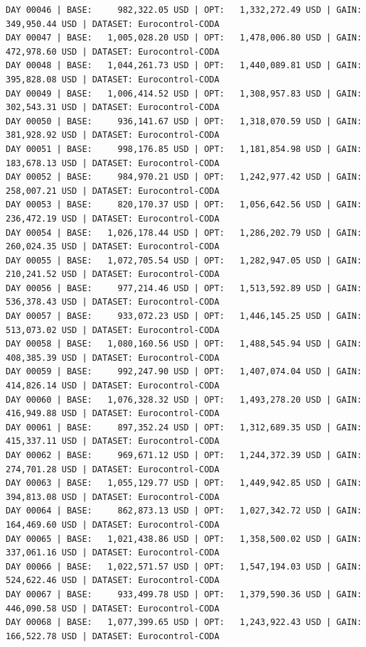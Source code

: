 \documentclass[11pt,a4paper]{article}
\begin{document}
\begin{verbatim}
DAY 00046 | BASE:     982,322.05 USD | OPT:   1,332,272.49 USD | GAIN: 349,950.44 USD | DATASET: Eurocontrol-CODA
DAY 00047 | BASE:   1,005,028.20 USD | OPT:   1,478,006.80 USD | GAIN: 472,978.60 USD | DATASET: Eurocontrol-CODA
DAY 00048 | BASE:   1,044,261.73 USD | OPT:   1,440,089.81 USD | GAIN: 395,828.08 USD | DATASET: Eurocontrol-CODA
DAY 00049 | BASE:   1,006,414.52 USD | OPT:   1,308,957.83 USD | GAIN: 302,543.31 USD | DATASET: Eurocontrol-CODA
DAY 00050 | BASE:     936,141.67 USD | OPT:   1,318,070.59 USD | GAIN: 381,928.92 USD | DATASET: Eurocontrol-CODA
DAY 00051 | BASE:     998,176.85 USD | OPT:   1,181,854.98 USD | GAIN: 183,678.13 USD | DATASET: Eurocontrol-CODA
DAY 00052 | BASE:     984,970.21 USD | OPT:   1,242,977.42 USD | GAIN: 258,007.21 USD | DATASET: Eurocontrol-CODA
DAY 00053 | BASE:     820,170.37 USD | OPT:   1,056,642.56 USD | GAIN: 236,472.19 USD | DATASET: Eurocontrol-CODA
DAY 00054 | BASE:   1,026,178.44 USD | OPT:   1,286,202.79 USD | GAIN: 260,024.35 USD | DATASET: Eurocontrol-CODA
DAY 00055 | BASE:   1,072,705.54 USD | OPT:   1,282,947.05 USD | GAIN: 210,241.52 USD | DATASET: Eurocontrol-CODA
DAY 00056 | BASE:     977,214.46 USD | OPT:   1,513,592.89 USD | GAIN: 536,378.43 USD | DATASET: Eurocontrol-CODA
DAY 00057 | BASE:     933,072.23 USD | OPT:   1,446,145.25 USD | GAIN: 513,073.02 USD | DATASET: Eurocontrol-CODA
DAY 00058 | BASE:   1,080,160.56 USD | OPT:   1,488,545.94 USD | GAIN: 408,385.39 USD | DATASET: Eurocontrol-CODA
DAY 00059 | BASE:     992,247.90 USD | OPT:   1,407,074.04 USD | GAIN: 414,826.14 USD | DATASET: Eurocontrol-CODA
DAY 00060 | BASE:   1,076,328.32 USD | OPT:   1,493,278.20 USD | GAIN: 416,949.88 USD | DATASET: Eurocontrol-CODA
DAY 00061 | BASE:     897,352.24 USD | OPT:   1,312,689.35 USD | GAIN: 415,337.11 USD | DATASET: Eurocontrol-CODA
DAY 00062 | BASE:     969,671.12 USD | OPT:   1,244,372.39 USD | GAIN: 274,701.28 USD | DATASET: Eurocontrol-CODA
DAY 00063 | BASE:   1,055,129.77 USD | OPT:   1,449,942.85 USD | GAIN: 394,813.08 USD | DATASET: Eurocontrol-CODA
DAY 00064 | BASE:     862,873.13 USD | OPT:   1,027,342.72 USD | GAIN: 164,469.60 USD | DATASET: Eurocontrol-CODA
DAY 00065 | BASE:   1,021,438.86 USD | OPT:   1,358,500.02 USD | GAIN: 337,061.16 USD | DATASET: Eurocontrol-CODA
DAY 00066 | BASE:   1,022,571.57 USD | OPT:   1,547,194.03 USD | GAIN: 524,622.46 USD | DATASET: Eurocontrol-CODA
DAY 00067 | BASE:     933,499.78 USD | OPT:   1,379,590.36 USD | GAIN: 446,090.58 USD | DATASET: Eurocontrol-CODA
DAY 00068 | BASE:   1,077,399.65 USD | OPT:   1,243,922.43 USD | GAIN: 166,522.78 USD | DATASET: Eurocontrol-CODA

\end{verbatim}
\end{document}
